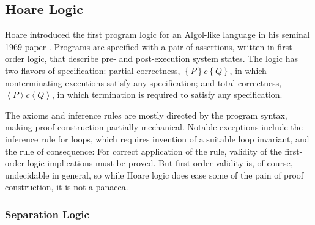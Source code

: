 \documentclass[11pt]{article}
\begin{document}
\subsection{Hoare Logic}

Hoare introduced the first program logic for an Algol-like language in his seminal 1969 paper \cite{DBLP:journals/cacm/Hoare69}. Programs are specified with a pair of assertions, written in first-order logic, that describe pre- and post-execution system states. The logic has two flavors of specification: partial correctness, $\left\lbrace P \right\rbrace c \left\lbrace Q \right\rbrace$, in which nonterminating executions satisfy any specification; and total correctness, $\left\langle P \right\rangle c \left\langle Q \right\rangle$, in which termination is required to satisfy any specification. 

The axioms and inference rules are mostly directed by the program syntax, making proof construction partially mechanical. Notable exceptions include the inference rule for loops, which requires invention of a suitable loop invariant, and the rule of consequence:  For correct application of the rule, validity of the first-order logic implications must be proved. But first-order validity is, of course, undecidable in general, so while Hoare logic does ease some of the pain of proof construction, it is not a panacea.


\subsubsection{Separation Logic}
\end{document}
